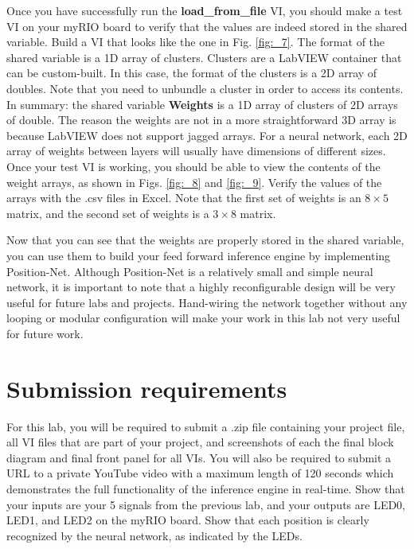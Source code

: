 \documentclass{article}
\begin{document}
Once you have successfully run the \textbf{load\_from\_file} VI, you should make a test VI on your myRIO board to verify that the values are indeed stored in the shared variable. Build a VI that looks like the one in Fig. \ref{fig:_7}. The format of the shared variable is a 1D array of clusters. Clusters are a LabVIEW container that can be custom-built. In this case, the format of the clusters is a 2D array of doubles. Note that you need to unbundle a cluster in order to access its contents. In summary: the shared variable \textbf{Weights} is a 1D array of clusters of 2D arrays of double. The reason the weights are not in a more straightforward 3D array is because LabVIEW does not support jagged arrays. For a neural network, each 2D array of weights between layers will usually have dimensions of different sizes. Once your test VI is working, you should be able to view the contents of the weight arrays, as shown in Figs. \ref{fig:_8} and \ref{fig:_9}. Verify the values of the arrays with the .csv files in Excel. Note that the first set of weights is an $8 \times 5$ matrix, and the second set of weights is a $3 \times 8$ matrix.  

Now that you can see that the weights are properly stored in the shared variable, you can use them to build your feed forward inference engine by implementing Position-Net. Although Position-Net is a relatively small and simple neural network, it is important to note that a highly reconfigurable design will be very useful for future labs and projects. Hand-wiring the network together without any looping or modular configuration will make your work in this lab not very useful for future work. 


\section{Submission requirements}

For this lab, you will be required to submit a .zip file containing your project file, all VI files that are part of your project, and screenshots of each the final block diagram and final front panel for all VIs. You will also be required to submit a URL to a private YouTube video with a maximum length of 120 seconds which demonstrates the full functionality of the inference engine in real-time. Show that your inputs are your 5 signals from the previous lab, and your outputs are LED0, LED1, and LED2 on the myRIO board. Show that each position is clearly recognized by the neural network, as indicated by the LEDs. 
\end{document}
